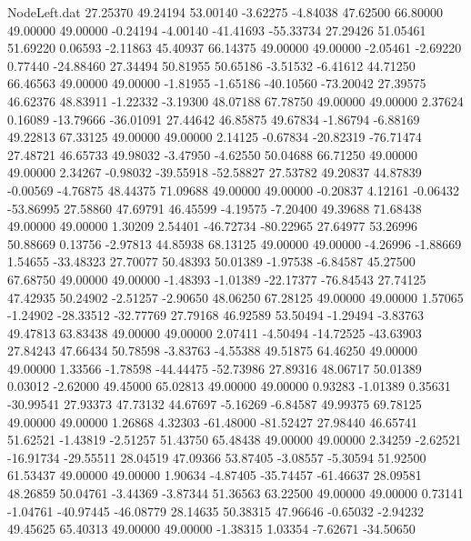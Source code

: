 \begin{filecontents}{NodeLeft.dat}
  27.25370   49.24194   53.00140    -3.62275   -4.84038   47.62500   66.80000   49.00000   49.00000   -0.24194   -4.00140  -41.41693  -55.33734
  27.29426   51.05461   51.69220     0.06593   -2.11863   45.40937   66.14375   49.00000   49.00000   -2.05461   -2.69220    0.77440  -24.88460
  27.34494   50.81955   50.65186    -3.51532   -6.41612   44.71250   66.46563   49.00000   49.00000   -1.81955   -1.65186  -40.10560  -73.20042
  27.39575   46.62376   48.83911    -1.22332   -3.19300   48.07188   67.78750   49.00000   49.00000    2.37624    0.16089  -13.79666  -36.01091
  27.44642   46.85875   49.67834    -1.86794   -6.88169   49.22813   67.33125   49.00000   49.00000    2.14125   -0.67834  -20.82319  -76.71474
  27.48721   46.65733   49.98032    -3.47950   -4.62550   50.04688   66.71250   49.00000   49.00000    2.34267   -0.98032  -39.55918  -52.58827
  27.53782   49.20837   44.87839    -0.00569   -4.76875   48.44375   71.09688   49.00000   49.00000   -0.20837    4.12161   -0.06432  -53.86995
  27.58860   47.69791   46.45599    -4.19575   -7.20400   49.39688   71.68438   49.00000   49.00000    1.30209    2.54401  -46.72734  -80.22965
  27.64977   53.26996   50.88669     0.13756   -2.97813   44.85938   68.13125   49.00000   49.00000   -4.26996   -1.88669    1.54655  -33.48323
  27.70077   50.48393   50.01389    -1.97538   -6.84587   45.27500   67.68750   49.00000   49.00000   -1.48393   -1.01389  -22.17377  -76.84543
  27.74125   47.42935   50.24902    -2.51257   -2.90650   48.06250   67.28125   49.00000   49.00000    1.57065   -1.24902  -28.33512  -32.77769
  27.79168   46.92589   53.50494    -1.29494   -3.83763   49.47813   63.83438   49.00000   49.00000    2.07411   -4.50494  -14.72525  -43.63903
  27.84243   47.66434   50.78598    -3.83763   -4.55388   49.51875   64.46250   49.00000   49.00000    1.33566   -1.78598  -44.44475  -52.73986
  27.89316   48.06717   50.01389     0.03012   -2.62000   49.45000   65.02813   49.00000   49.00000    0.93283   -1.01389    0.35631  -30.99541
  27.93373   47.73132   44.67697    -5.16269   -6.84587   49.99375   69.78125   49.00000   49.00000    1.26868    4.32303  -61.48000  -81.52427
  27.98440   46.65741   51.62521    -1.43819   -2.51257   51.43750   65.48438   49.00000   49.00000    2.34259   -2.62521  -16.91734  -29.55511
  28.04519   47.09366   53.87405    -3.08557   -5.30594   51.92500   61.53437   49.00000   49.00000    1.90634   -4.87405  -35.74457  -61.46637
  28.09581   48.26859   50.04761    -3.44369   -3.87344   51.36563   63.22500   49.00000   49.00000    0.73141   -1.04761  -40.97445  -46.08779
  28.14635   50.38315   47.96646    -0.65032   -2.94232   49.45625   65.40313   49.00000   49.00000   -1.38315    1.03354   -7.62671  -34.50650

\end{filecontents}
